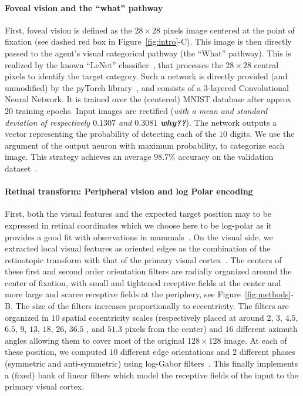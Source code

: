 \paragraph{Foveal vision and the ``what'' pathway}
First, foveal vision is defined as the $28\times 28$ pixels image centered at the point of fixation (see dashed red box in Figure~\ref{fig:intro}-C). This image is then directly passed to the agent's visual categorical pathway (the ``What'' pathway). This is realized by the known ``LeNet'' classifier~\citep{Lecun1998}, that processes the $28 \times 28$ central pixels to identify the target category. Such a network is directly provided (and unmodified) by the pyTorch library~\citep{Paszke17}, and consists of a 3-layered Convolutional Neural Network. It is trained over the (centered) MNIST database after approx $20$ training epochs. \ICANN
\else
Input images are rectified (\emph{with a mean and standard deviation of respectively $0.1307$ and $0.3081$ {\bf why??}}). \fi The network outputs a vector representing the probability of detecting each of the $10$ digits. We use the argument of the output neuron with maximum probability, to categorize each image. This strategy achieves an average $98.7\%$ accuracy on the validation dataset~\citep{Lecun1998}. %

\paragraph{Retinal transform: Peripheral vision and log Polar encoding}
First, both the visual features and the expected target position may to be expressed in retinal coordinates which we choose here to be log-polar as it provides a good fit with observations in mammals~\citep{Traver10}. On the visual side, we extracted local visual features as oriented edges  as the combination of the retinotopic transform with that of the primary visual cortex~\citep{Fischer2007a}. The centers of these first and second order orientation filters are radially organized around the center of fixation, with small and tightened receptive fields at the center and more large and scarce receptive fields at the periphery, see  Figure~\ref{fig:methods}-B. The size of the filters increases proportionally to eccentricity. The filters are organized in $10$ spatial eccentricity scales (respectively placed at around $2$, $3$, $4.5$, $6.5$, $9$, $13$, $18$, $26$, $36.5$ , and $51.3$ pixels from the center) and $16$ different azimuth angles allowing them to cover most of the original $128 \times 128 $ image. At each of these position, we computed $10$ different edge orientations and $2$ different phases (symmetric and anti-symmetric) using log-Gabor filters~\citep{Fischer2007a}. This finally implements a (fixed) bank of linear filters which model the receptive fields of the input to the primary visual cortex.

